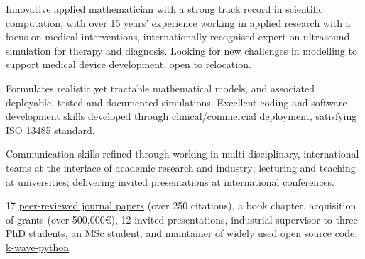 \documentclass[english, print]{cv-style-wide}
\begin{document}

%
\setul{0.5ex}{0.4pt}%
Innovative applied mathematician with a strong track record in {scientific computation}, with over 15 years' experience working in applied research with a focus on medical interventions, internationally recognised expert on ultrasound simulation for therapy and diagnosis. Looking for new challenges in modelling to support medical device development, open to relocation.
  \begin{NoHyphItemize}
    \item Formulates realistic yet tractable mathematical models, and associated deployable, tested and documented simulations.  Excellent {coding} and {software development} skills developed through clinical/commercial deployment, satisfying ISO 13485 standard.  
    \item Communication skills refined through working in multi-disciplinary, international teams at the interface of academic research and industry; lecturing and teaching at universities; delivering invited presentations at international conferences. %
    \item 17 \href{https://scholar.google.co.uk/citations?user=lauJqakAAAAJ&hl=en}{peer-reviewed journal papers} (over 250 citations), a book chapter, acquisition of grants (over 500,000\euro), 12 invited presentations, industrial supervisor to three PhD students, an MSc student, and maintainer of widely used open source code, \href{https://k-wave-python.readthedocs.io/en/latest/index.html#citation}{{k-wave-python}}
  \end{NoHyphItemize}
  
\end{document}
